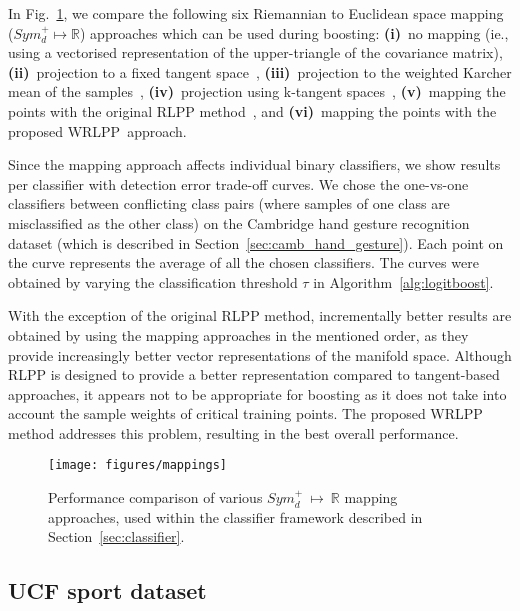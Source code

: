 \documentclass[10pt,twocolumn,letterpaper]{article}
\newcommand{\alg}[1]{\mbox{Algorithm~\ref{#1}}}
\newcommand{\fig}[1]{\mbox{Fig.~\ref{#1}}}
\newcommand{\eqsize}{\footnotesize}
\newcommand{\wrlpp}{WRLPP}
\begin{document}
In \fig{fig:mappings}, we compare the following six Riemannian to Euclidean space mapping ({\eqsize $Sym_d^+ \mapsto \mathbb{R}$})
approaches which can be used during boosting:
{\bf (i)}~no mapping (ie., using a vectorised representation of the upper-triangle of the covariance matrix),
{\bf (ii)}~projection to a fixed tangent space~\cite{GuoEtAl2010},
{\bf (iii)}~projection to the weighted Karcher mean of the samples~\cite{TuzelEtAl2008},
{\bf (iv)}~projection using k-tangent spaces~\cite{SaninEtAl2012},
{\bf (v)}~mapping the points with the original RLPP method~\cite{HarandiEtAl2012},
and
{\bf (vi)}~mapping the points with the proposed \wrlpp~approach.

Since the mapping approach affects individual binary classifiers,
we show results per classifier with detection error trade-off curves.
We chose the one-vs-one classifiers between conflicting class pairs
(where samples of one class are misclassified as the other class)
on the Cambridge hand gesture recognition dataset
(which is described in Section~\ref{sec:camb_hand_gesture}). Each point on the curve represents the average of all the chosen classifiers.
The curves were obtained by varying the classification threshold {\eqsize $\tau$} in \alg{alg:logitboost}.

With the exception of the original RLPP method, incrementally better results are obtained by using the mapping approaches in the mentioned order,
as they provide increasingly better vector representations of the manifold space.
Although RLPP is designed to provide a better representation compared to tangent-based approaches,
it appears not to be appropriate for boosting as it does not take into account the sample weights of critical training points.
The proposed WRLPP method addresses this problem, resulting in the best overall performance.

\begin{figure}[!tb]
  \centering
  \texttt{[image: figures/mappings]}
  \caption
    {
    \small
    Performance comparison of various {\eqsize $Sym_d^+~\mapsto~\mathbb{R}$} mapping approaches,
    used within the classifier framework described in Section~\ref{sec:classifier}.
    }
  \label{fig:mappings}
\end{figure}





\subsection{UCF sport dataset}
\vspace{-0.5ex}
\end{document}
